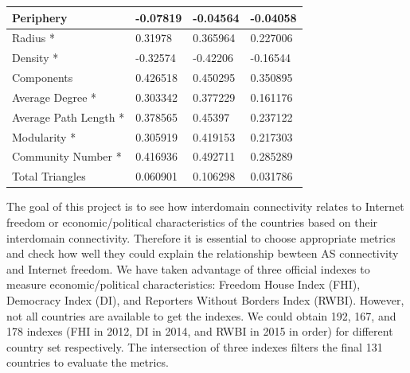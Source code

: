 \documentclass{article}
\begin{document}
\begin{table}[ht]
\begin{tabular}{|l|l|l|l|}
Periphery                                              & -0.07819     & -0.04564    & -0.04058      \\ \hline
Radius *                                               & 0.31978      & 0.365964    & 0.227006      \\ \hline
Density *                                               & -0.32574     & -0.42206    & -0.16544      \\ \hline
Components                                             & 0.426518     & 0.450295    & 0.350895      \\ \hline
Average Degree *                                        & 0.303342     & 0.377229    & 0.161176      \\ \hline
Average Path Length *                                   & 0.378565     & 0.45397     & 0.237122      \\ \hline
Modularity *                                            & 0.305919     & 0.419153    & 0.217303      \\ \hline
Community Number *                                      & 0.416936     & 0.492711    & 0.285289      \\ \hline
Total  Triangles                                       & 0.060901     & 0.106298    & 0.031786      \\ \hline
\end{tabular}
\end{table}

\noindent 
The goal of this project is to see how interdomain connectivity relates to
Internet freedom or economic/political characteristics of the countries based on
their interdomain connectivity. Therefore it is essential to choose appropriate
metrics and check how well they could explain the relationship bewteen AS
connectivity and Internet freedom. We have taken advantage of three official
indexes to measure economic/political characteristics: Freedom House Index (FHI),
Democracy Index (DI), and Reporters Without Borders Index (RWBI). However, not
all countries are available to get the indexes. We could obtain 192, 167, and
178 indexes (FHI in 2012, DI in 2014, and RWBI in 2015 in order) for different
country set respectively. The intersection of three indexes filters the final
131 countries to evaluate the metrics.

\bigskip
\end{document}
